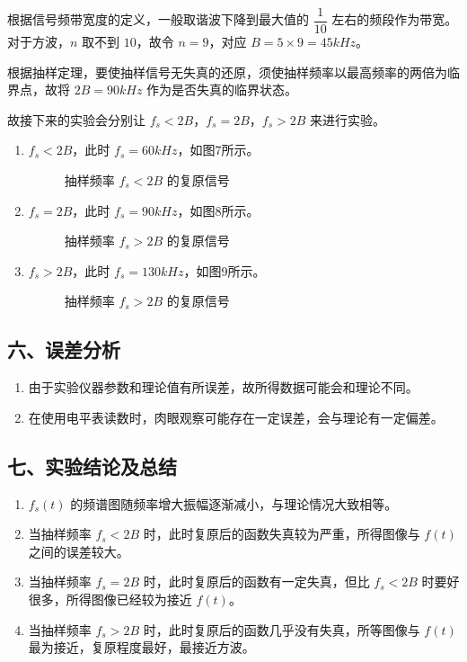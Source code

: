 \documentclass[dvipsnames, svgnames,a4paper,11pt]{article}
\begin{document}
\begin{enumerate}
    根据信号频带宽度的定义，一般取谐波下降到最大值的 $\dfrac{1}{10}$ 左右的频段作为带宽。对于方波，$n$ 取不到 $10$，故令 $n = 9$，对应 $B = 5 \times 9 = 45kHz$。

    根据抽样定理，要使抽样信号无失真的还原，须使抽样频率以最高频率的两倍为临界点，故将 $2B = 90kHz$ 作为是否失真的临界状态。
    
    故接下来的实验会分别让 $f_s < 2B$，$f_s = 2B$，$f_s > 2B$ 来进行实验。
    \begin{enumerate}
      \item $f_s < 2B$，此时 $f_s = 60 kHz$，如图7所示。
        \begin{figure}[htbp]
          \centering
          \caption{抽样频率 $f_s < 2B$ 的复原信号}
        \end{figure}
      \item $f_s = 2B$，此时 $f_s = 90 kHz$，如图8所示。
        \begin{figure}[htbp]
          \centering
          \caption{抽样频率 $f_s > 2B$ 的复原信号}
        \end{figure}
      \newpage
      \item $f_s > 2B$，此时 $f_s = 130 kHz$，如图9所示。
        \begin{figure}[htbp]
          \centering
          \caption{抽样频率 $f_s > 2B$ 的复原信号}
        \end{figure}
    \end{enumerate}
\end{enumerate}

\subsection*{六、误差分析}
\begin{enumerate}
  \item 由于实验仪器参数和理论值有所误差，故所得数据可能会和理论不同。
  \item 在使用电平表读数时，肉眼观察可能存在一定误差，会与理论有一定偏差。
\end{enumerate}

\subsection*{七、实验结论及总结}
\begin{enumerate}
  \item $f_s(t)$ 的频谱图随频率增大振幅逐渐减小，与理论情况大致相等。
  \item 当抽样频率 $f_s < 2B$ 时，此时复原后的函数失真较为严重，所得图像与 $f(t)$ 之间的误差较大。
  \item 当抽样频率 $f_s = 2B$ 时，此时复原后的函数有一定失真，但比 $f_s < 2B$ 时要好很多，所得图像已经较为接近 $f(t)$。
  \item 当抽样频率 $f_s > 2B$ 时，此时复原后的函数几乎没有失真，所等图像与 $f(t)$ 最为接近，复原程度最好，最接近方波。
\end{enumerate}
\end{document}
